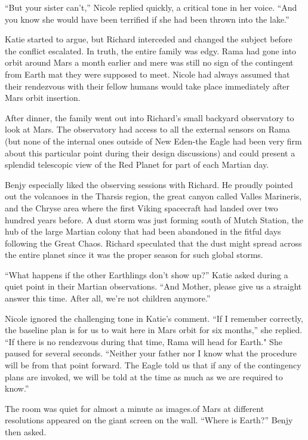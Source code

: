 \documentclass[]{article}
\begin{document}
{“But your sister can’t,” Nicole replied quickly, a critical tone in her voice.  “And you know she would have been terrified if she had been thrown into the lake.”

Katie started to argue, but Richard interceded and changed the subject before the conflict escalated.  In truth, the entire family was edgy.  Rama had gone into orbit around Mars a month earlier and mere was still no sign of the contingent from Earth mat they were supposed to meet.  Nicole had always assumed that their rendezvous with their fellow humans would take place immediately after Mars orbit insertion.

After dinner, the family went out into Richard’s small backyard observatory to look at Mars.  The observatory had access to all the external sensors on Rama (but none of the internal ones outside of New Eden-the Eagle had been very firm about this particular point during their design discussions) and could present a splendid telescopic view of the Red Planet for part of each Martian day.

Benjy especially liked the observing sessions with Richard.  He proudly pointed out the volcanoes in the Tharsis region, the great canyon called Valles Marineris, and the Chryse area where the first Viking spacecraft had landed over two hundred years before.  A dust storm was just forming south of Mutch Station, the hub of the large Martian colony that had been abandoned in the fitful days following the Great Chaos.  Richard speculated that the dust might spread across the entire planet since it was the proper season for such global storms.

“What happens if the other Earthlings don’t show up?” Katie asked during a quiet point in their Martian observations.  “And Mother, please give us a straight answer this time.  After all, we’re not children anymore.”

Nicole ignored the challenging tone in Katie’s comment.  “If I remember correctly, the baseline plan is for us to wait here in Mars orbit for six months,” she replied.  “If there is no rendezvous during that time, Rama will head for Earth."  She paused for several seconds.  “Neither your father nor I know what the procedure will be from that point forward.  The Eagle told us that if any of the contingency plans are invoked, we will be told at the time as much as we are required to know.”

The room was quiet for almost a minute as images.of Mars at different resolutions appeared on the giant screen on the wall.  “Where is Earth?” Benjy then asked.

}
\end{document}
